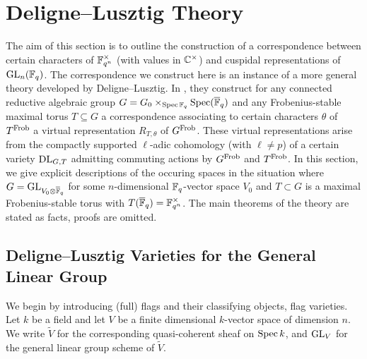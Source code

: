 \documentclass[../main.tex]{subfiles}
\begin{document}
\section{Deligne--Lusztig Theory} 
\label{sub:Deligne-Lusztig Theory for Depth Zero Representations}
The aim of this section is to outline the construction of a correspondence
between certain characters of $\mathbb{F}_{q^n}^\times$ (with values in $\mathbb{C}^\times$) and 
cuspidal representations of $\operatorname{GL}_n(\mathbb{F}_q)$. The correspondence we construct here
is an instance of a more general theory developed by Deligne--Lusztig. 
In \cite{delignelusztig1976}, they construct
for any connected reductive algebraic group $G = G_0 \times_{\operatorname{Spec} \mathbb{F}_q}
\operatorname{Spec}(\overline {\mathbb{F}}_q)$ and any
Frobenius-stable maximal torus $T \subseteq G$ a correspondence associating to
certain characters $\theta$ of $T^{\mathrm{Frob}}$ a virtual representation $R_{T,\theta}$ of 
$G^{\mathrm{Frob}}$. These virtual representations arise from the compactly supported
$\ell$-adic cohomology (with $\ell \neq p$) of a certain variety $\mathrm{DL}_{G,T}$
admitting commuting actions by $G^{\mathrm{Frob}}$ and $T^{\mathrm{Frob}}$. 
In this section, we give explicit descriptions of the occuring spaces 
in the situation where $G = \operatorname{GL}_{V_0 \otimes \overline {\mathbb{F}}_q}$ for some
$n$-dimensional $\mathbb{F}_q$-vector space $V_0$ and $T \subset G$ is a maximal 
Frobenius-stable torus with $T(\overline {\mathbb{F}}_q) = \mathbb{F}_{q^n}^\times$.
The main theorems of the theory are stated as facts, proofs are omitted.

\subsection{Deligne--Lusztig Varieties for the General Linear Group} %
\label{ssub:Deligne--Lusztig Varieties}
We begin by introducing (full) flags and their classifying objects, flag
varieties. Let $k$ be a field and let $V$ be a finite dimensional $k$-vector space
of dimension $n$. We write $\tilde V$ for the corresponding quasi-coherent sheaf
on $\operatorname{Spec} k$, and $\operatorname{GL}_V$ for the general linear group scheme of $\tilde V$.
\end{document}
